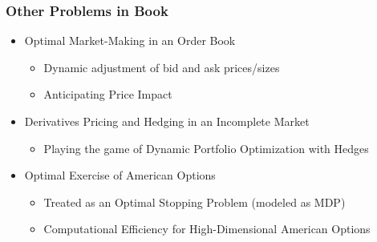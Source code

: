 \documentclass[handout]{beamer}
\begin{document}
\begin{frame}
\frametitle{Other Problems in Book}
\pause
\begin{itemize}[<+->]
\item Optimal Market-Making in an Order Book
\begin{itemize}
\item Dynamic adjustment of bid and ask prices/sizes
\item Anticipating Price Impact 
\end{itemize}
\item Derivatives Pricing and Hedging in an Incomplete Market
\begin{itemize}
\item Playing the game of Dynamic Portfolio Optimization with Hedges
\end{itemize}
\item Optimal Exercise of American Options
\begin{itemize}
\item Treated as an Optimal Stopping Problem (modeled as MDP)
\item Computational Efficiency for High-Dimensional American Options
\end{itemize}
\end{itemize}
\end{frame}
\end{document}
